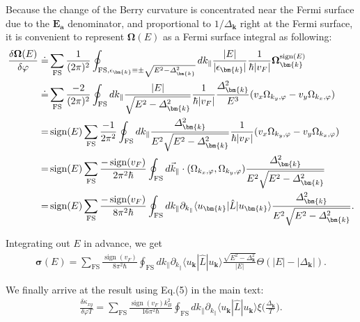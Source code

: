 \begin{subappendices}
Because the change of the Berry curvature is concentrated near the Fermi surface due to the $\mathbf E_{\mathbf a}$ denominator, and proportional to $1/\varDelta_{\bm{k}}$ right at the Fermi surface, it is convenient to represent $\boldsymbol\Omega(E)$ as a Fermi surface integral as following:
\begin{align}
	\frac{\delta\boldsymbol\Omega(E)}{\delta\varphi}
	\doteq &\sum_{\text{FS}}\frac{1}{(2\pi)^2}\oint _{\text{FS},\epsilon_{\bm{k}}\equiv\pm\sqrt{E^2-\varDelta_{\bm{k}}^2}} dk_\parallel \frac{|E|}{|\epsilon_{\bm{k}}|}\frac{1}{\hbar |v_F|}\mathbf\Omega^{\mathop{\mathrm{sign}}(E)}_{\bm{k}}\notag\\
	\doteq &\sum_{\text{FS}}\frac{-2}{(2\pi)^2}\oint _{\text{FS}} dk_\parallel \frac{|E|}{\sqrt{E^2-\varDelta_{\bm{k}}^2}}\frac{1}{\hbar |v_F|}\frac{\varDelta_{\bm{k}}^2}{E^3}(v_x\Omega_{k_y,\varphi}-v_y\Omega_{k_x,\varphi})\notag\\
	=&\mathop{\mathrm{sign}}(E)\sum_{\text{FS}}\frac{-1}{2\pi^2}\oint _{\text{FS}} dk_\parallel \frac{\varDelta_{\bm{k}}^2}{E^2\sqrt{E^2-\varDelta_{\bm{k}}^2}}\frac{1}{\hbar |v_F|}(v_x\Omega_{k_y,\varphi}-v_y\Omega_{k_x,\varphi})\notag\\
	=&\mathop{\mathrm{sign}}(E)\sum_{\text{FS}}\frac{-\mathop{\mathrm{sign}}(v_F)}{2\pi^2\hbar}\oint _{\text{FS}} d\vec k_\parallel \cdot (\Omega_{k_x,\varphi},\Omega_{k_y,\varphi}) \frac{\varDelta_{\bm{k}}^2}{E^2\sqrt{E^2-\varDelta_{\bm{k}}^2}}\notag\\
	=&\mathop{\mathrm{sign}}(E)\sum_{\text{FS}}\frac{-\mathop{\mathrm{sign}}(v_F)}{8\pi^2\hbar}\oint _{\text{FS}} d k_\parallel \partial_{k_\parallel} \langle u_{\bm{k}}|\hat L|u_{\bm{k}} \rangle \frac{\varDelta_{\bm{k}}^2}{E^2\sqrt{E^2-\varDelta_{\bm{k}}^2}}.
\end{align}

Integrating out $E$ in advance, we get
\begin{align}
	\boldsymbol\sigma(E)=\sum_{\text{FS}}\frac{\mathop{\mathrm{sign}}(v_F)}{8\pi^2\hbar}\oint _{\text{FS}} d k_\parallel \partial_{k_\parallel} \langle u_{\bm{k}}|\hat L|u_{\bm{k}} \rangle \frac{\sqrt{E^2-\varDelta_{\bm{k}}^2}}{|E|}\Theta(|E|-|\varDelta_{\bm{k}}|).
\end{align}

We finally arrive at the result using Eq.(5) in the main text:
\begin{align}
	\frac{\delta\kappa_{xy}}{\delta\varphi T}=\sum_{\text{FS}}\frac{\mathop{\mathrm{sign}}(v_F)k_B^2}{16\pi^2\hbar}\oint _{\text{FS}} d k_\parallel \partial_{k_\parallel} \langle u_{\bm{k}}|\hat L|u_{\bm{k}} \rangle \xi\bigg(\frac{\varDelta_{\bm{k}}}{T}\bigg).
\end{align}




\end{subappendices}
